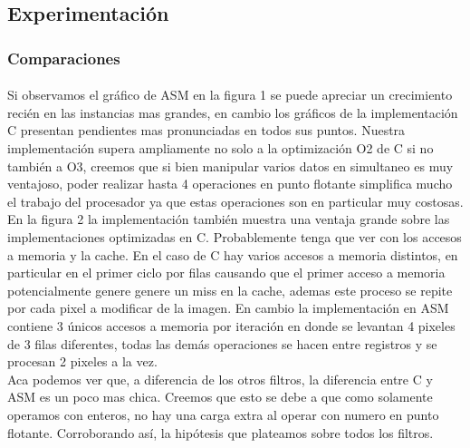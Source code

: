 \documentclass[a4paper]{article}
\begin{document}
\subsection{Experimentaci\'on}

\subsubsection{Comparaciones}

\paragraph{} Si observamos el gr\'afico de ASM en la figura 1 se puede apreciar un crecimiento recién en las instancias mas grandes, en cambio los gr\'aficos de la implementaci\'on C presentan pendientes mas pronunciadas en todos sus puntos. Nuestra implementaci\'on supera ampliamente no solo a la optimizaci\'on O2 de C si no también a O3, creemos que si bien manipular varios datos en simultaneo es muy ventajoso, poder realizar hasta 4 operaciones en punto flotante simplifica mucho el trabajo del procesador ya que estas operaciones son en particular muy costosas.\\
 
 En la figura 2 la implementaci\'on también muestra una ventaja grande sobre las implementaciones optimizadas en C. Probablemente tenga que ver con los accesos a memoria y la cache. En el caso de C hay varios accesos a memoria distintos, en particular en el primer ciclo por filas causando que el primer acceso a memoria potencialmente genere genere un miss en la cache, ademas este proceso se repite por cada pixel a modificar de la imagen. En cambio la implementaci\'on en ASM contiene 3 \'unicos accesos a memoria por iteraci\'on en donde se levantan 4 pixeles de 3 filas diferentes, todas las dem\'as operaciones se hacen entre registros y se procesan 2 pixeles a la vez.  \\

 Aca podemos ver que, a diferencia de los otros filtros, la diferencia entre C y ASM es un poco mas chica. Creemos que esto se debe a que como solamente operamos con enteros, no hay una carga extra al operar con numero en punto flotante. Corroborando así, la hipótesis que plateamos sobre todos los filtros.
\end{document}
